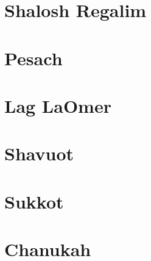 \documentclass[letterpaper]{memoir}
\newcommand{\song}[2]{}
\begin{document}
\chapter{Shalosh Regalim}
\song{Mauzi}{Mauzi.pdf}
\song{Samachti Tehillim 122}{Samachti.pdf}
\song{B'tzeit Yisrael}{Btzeit_Yisrael.pdf}
\song{Aromimcha}{Aromimcha.pdf}

\chapter{Pesach}
\song{Yachid Norah}{Yachid_Norah.pdf}
\song{Rachum Atah}{Rachum_Atah.pdf}
\song{B'neh Li Zevul Mishkani}{Bneh_Li_Zevul_Mishkani.pdf}
\song{Emunim Irchu Shevach (Yerushalmi)}{Emunim_Irchu_Shevach_Yerushalyim.pdf}
\song{Emunim Irchu Shevach (Syrian)}{Emunim_Irchu_Shevach_Syrian.pdf}
\song{Mi Yimalel Gevurotecha}{Mi_Yimalel_Gevurotecha.pdf}
\song{El B'Yado}{El_BYado.pdf}
\song{El B'Yado \#2}{El_BYado_2.pdf}
\song{El Maleh HaNechsar}{El_Maleh_HaNechsar.pdf}
\song{Ashir laEl Ga'oh Ga'ah}{Ashir_laEl_Gaoh_Gaah.pdf}

\chapter{Lag LaOmer}
\song{V'amartem Ko Lachai}{Vamartem_Ko_Lachai.pdf}

\chapter{Shavuot}
\song{Roe' Ne'eman Hu}{Roe_Neeman_Hu.pdf}
\song{T'nu Kavod LaTorah}{Tnu_Kavod_LaTorah.pdf}
\song{Da'at Umzimah}{Daat_Umzimah.pdf}

\chapter{Sukkot}
\song{Sukkah v'Lulav (Moroccan)}{Sukkah_vLulav_Moroccan.pdf}
\song{Sukkah v'Lulav (Yerushalmi)}{Sukkah_vLulav_Yerushalmi.pdf}
\song{Sukkah v'Lulav (Iraqi)}{Sukkah_vLulav_Iraqi.pdf}
\song{Chanun Rachem}{Chanun_Rachem.pdf}
\song{Yah Et Sukkat David Takim}{Yah_Et_Sukkat_David_Takim.pdf}
\song{Nizke l'kol Berachot (Iraqi)}{Nizke_lkol_Berachot_Bavel.pdf}
\song{Nizke l'kol Berachot}{Nizke_lkol_Berachot.pdf}

\chapter{Chanukah}
\song{Yah Hatzel Yonah}{Yah_Hatzel_Yonah.pdf}
\song{Heichalo Heichalo}{Heichalo_Heichalo.pdf}
\song{L'neri}{Lneri.pdf}
\song{Am Ne'emanai}{Am_Neemanai.pdf}
\end{document}
